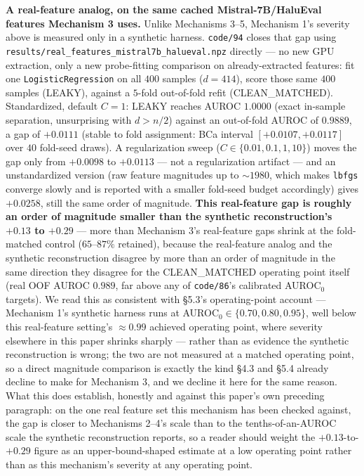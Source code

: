 \documentclass[10pt]{article} %
\begin{document}
\textbf{A real-feature analog, on the same cached Mistral-7B/HaluEval features
Mechanism 3 uses.} Unlike Mechanisms 3--5, Mechanism 1's severity above is
measured only in a synthetic harness. \texttt{code/94} closes that gap using
\texttt{results/real\_features\_mistral7b\_halueval.npz} directly --- no new
GPU extraction, only a new probe-fitting comparison on already-extracted
features: fit one \texttt{LogisticRegression} on all $400$ samples
($d=414$), score those same $400$ samples (LEAKY), against a $5$-fold
out-of-fold refit (CLEAN\_MATCHED). Standardized, default $C=1$: LEAKY reaches
AUROC $1.0000$ (exact in-sample separation, unsurprising with $d>n/2$) against
an out-of-fold AUROC of $0.9889$, a gap of $\mathbf{+0.0111}$ (stable to fold
assignment: BCa interval $[+0.0107,+0.0117]$ over $40$ fold-seed draws). A
regularization sweep ($C\in\{0.01,0.1,1,10\}$) moves the gap only from
$+0.0098$ to $+0.0113$ --- not a regularization artifact --- and an
unstandardized version (raw feature magnitudes up to $\sim1980$, which makes
\texttt{lbfgs} converge slowly and is reported with a smaller fold-seed
budget accordingly) gives $+0.0258$, still the same order of magnitude.
\textbf{This real-feature gap is roughly an order of magnitude smaller than
the synthetic reconstruction's $+0.13$ to $+0.29$} --- more than Mechanism
3's real-feature gaps shrink at the fold-matched control ($65$--$87\%$
retained), because the real-feature analog and the synthetic reconstruction
disagree by more than an order of magnitude in the same direction they
disagree for the CLEAN\_MATCHED operating point itself (real OOF AUROC
$0.989$, far above any of \texttt{code/86}'s calibrated AUROC$_0$ targets).
We read this as consistent with §5.3's operating-point account --- Mechanism
1's synthetic harness runs at AUROC$_0\in\{0.70,0.80,0.95\}$, well below this
real-feature setting's $\approx0.99$ achieved operating point, where severity
elsewhere in this paper shrinks sharply --- rather than as evidence the
synthetic reconstruction is wrong; the two are not measured at a matched
operating point, so a direct magnitude comparison is exactly the kind §4.3
and §5.4 already decline to make for Mechanism 3, and we decline it here for
the same reason. What this does establish, honestly and against this
paper's own preceding paragraph: on the one real feature set this mechanism
has been checked against, the gap is closer to Mechanisms 2--4's scale than
to the tenths-of-an-AUROC scale the synthetic reconstruction reports, so a
reader should weight the $+0.13$-to-$+0.29$ figure as an upper-bound-shaped
estimate at a low operating point rather than as this mechanism's severity
at any operating point.
\end{document}
